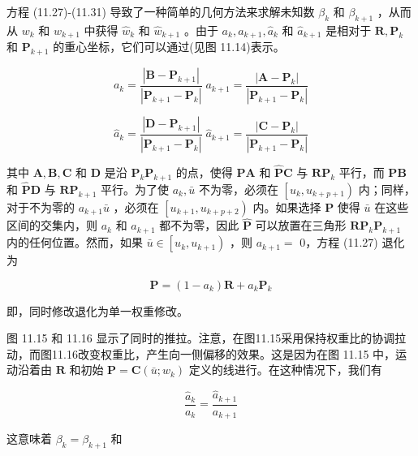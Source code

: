 \documentclass[../main.tex]{subfiles}
\begin{document}
方程 (11.27)-(11.31) 导致了一种简单的几何方法来求解未知数 \({\beta }_{k}\) 和 \({\beta }_{k + 1}\) ，从而从 \({w}_{k}\) 和 \({w}_{k + 1}\) 中获得 \({\widehat{w}}_{k}\) 和 \({\widehat{w}}_{k + 1}\) 。由于 \({a}_{k},{a}_{k + 1},{\widehat{a}}_{k}\) 和 \({\widehat{a}}_{k + 1}\) 是相对于 \(\mathbf{R},{\mathbf{P}}_{k}\) 和 \({\mathbf{P}}_{k + 1}\) 的重心坐标，它们可以通过(见图 11.14)表示。

\[
{a}_{k} = \frac{\left| \mathbf{B} - {\mathbf{P}}_{k + 1}\right| }{\left| {\mathbf{P}}_{k + 1} - {\mathbf{P}}_{k}\right| }\;{a}_{k + 1} = \frac{\left| \mathbf{A} - {\mathbf{P}}_{k}\right| }{\left| {\mathbf{P}}_{k + 1} - {\mathbf{P}}_{k}\right| }
\]

\[
{\widehat{a}}_{k} = \frac{\left| \mathbf{D} - {\mathbf{P}}_{k + 1}\right| }{\left| {\mathbf{P}}_{k + 1} - {\mathbf{P}}_{k}\right| }\;{\widehat{a}}_{k + 1} = \frac{\left| \mathbf{C} - {\mathbf{P}}_{k}\right| }{\left| {\mathbf{P}}_{k + 1} - {\mathbf{P}}_{k}\right| } \tag{11.32}
\]

其中 \(\mathbf{A},\mathbf{B},\mathbf{C}\) 和 \(\mathbf{D}\) 是沿 \({\mathbf{P}}_{k}{\mathbf{P}}_{k + 1}\) 的点，使得 \(\mathbf{{PA}}\) 和 \(\widehat{\mathbf{P}}\mathbf{C}\) 与 \(\mathbf{R}{\mathbf{P}}_{k}\) 平行，而 \(\mathbf{{PB}}\) 和 \(\widehat{\mathbf{P}}\mathbf{D}\) 与 \(\mathbf{R}{\mathbf{P}}_{k + 1}\) 平行。为了使 \({a}_{k},\bar{u}\) 不为零，必须在 \(\left\lbrack  {{u}_{k},{u}_{k + p + 1}}\right)\) 内；同样，对于不为零的 \({a}_{k + 1}\bar{u}\) ，必须在 \(\left\lbrack  {{u}_{k + 1},{u}_{k + p + 2}}\right)\) 内。如果选择 \(\mathbf{P}\) 使得 \(\bar{u}\) 在这些区间的交集内，则 \({a}_{k}\) 和 \({a}_{k + 1}\) 都不为零，因此 \(\widehat{\mathbf{P}}\) 可以放置在三角形 \(\mathbf{R}{\mathbf{P}}_{k}{\mathbf{P}}_{k + 1}\) 内的任何位置。然而，如果 \(\bar{u} \in  \left\lbrack  {{u}_{k},{u}_{k + 1}}\right)\) ，则 \({a}_{k + 1} =\) 0，方程 (11.27) 退化为

\[
\mathbf{P} = \left( {1 - {a}_{k}}\right) \mathbf{R} + {a}_{k}{\mathbf{P}}_{k} \tag{11.33}
\]

即，同时修改退化为单一权重修改。

图 11.15 和 11.16 显示了同时的推拉。注意，在图11.15采用保持权重比的协调拉动，而图11.16改变权重比，产生向一侧偏移的效果。这是因为在图 11.15 中，运动沿着由 \(\mathbf{R}\) 和初始 \(\mathbf{P} = \mathbf{C}\left( {\bar{u};{w}_{k}}\right)\) 定义的线进行。在这种情况下，我们有

\[
\frac{{\widehat{a}}_{k}}{{a}_{k}} = \frac{{\widehat{a}}_{k + 1}}{{a}_{k + 1}}
\]

这意味着 \({\beta }_{k} = {\beta }_{k + 1}\) 和
\end{document}
